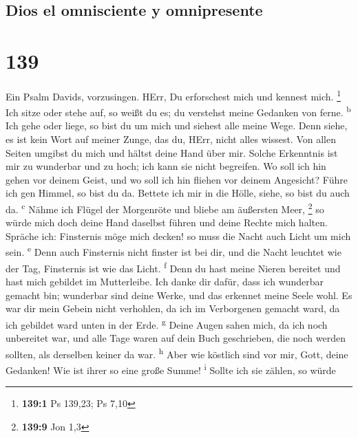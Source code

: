 \hypertarget{dios-el-omnisciente-y-omnipresente}{%
\subsection{Dios el omnisciente y
omnipresente}\label{dios-el-omnisciente-y-omnipresente}}

\hypertarget{section-138}{%
\section{139}\label{section-138}}

 Ein Psalm Davids, vorzusingen. HErr, Du erforschest mich
und kennest mich. \footnote{\textbf{139:1} Ps 139,23; Ps 7,10}
 Ich sitze oder stehe auf, so weißt du es; du verstehst
meine Gedanken von ferne. \textsuperscript{b}  Ich gehe
oder liege, so bist du um mich und siehest alle meine Wege.
 Denn siehe, es ist kein Wort auf meiner Zunge, das du,
HErr, nicht alles wissest.  Von allen Seiten umgibst du
mich und hältst deine Hand über mir.  Solche Erkenntnis
ist mir zu wunderbar und zu hoch; ich kann sie nicht begreifen.
 Wo soll ich hin gehen vor deinem Geist, und wo soll ich
hin fliehen vor deinem Angesicht?  Führe ich gen Himmel,
so bist du da. Bettete ich mir in die Hölle, siehe, so bist du auch da.
\textsuperscript{c}  Nähme ich Flügel der Morgenröte und
bliebe am äußersten Meer, \footnote{\textbf{139:9} Jon 1,3}
 so würde mich doch deine Hand daselbst führen und deine
Rechte mich halten.  Spräche ich: Finsternis möge mich
decken! so muss die Nacht auch Licht um mich sein. \textsuperscript{e}
 Denn auch Finsternis nicht finster ist bei dir, und die
Nacht leuchtet wie der Tag, Finsternis ist wie das Licht.
\textsuperscript{f}  Denn du hast meine Nieren bereitet
und hast mich gebildet im Mutterleibe.  Ich danke dir
dafür, dass ich wunderbar gemacht bin; wunderbar sind deine Werke, und
das erkennet meine Seele wohl.  Es war dir mein Gebein
nicht verhohlen, da ich im Verborgenen gemacht ward, da ich gebildet
ward unten in der Erde. \textsuperscript{g}  Deine Augen
sahen mich, da ich noch unbereitet war, und alle Tage waren auf dein
Buch geschrieben, die noch werden sollten, als derselben keiner da war.
\textsuperscript{h}  Aber wie köstlich sind vor mir,
Gott, deine Gedanken! Wie ist ihrer so eine große Summe!
\textsuperscript{i}  Sollte ich sie zählen, so würde
